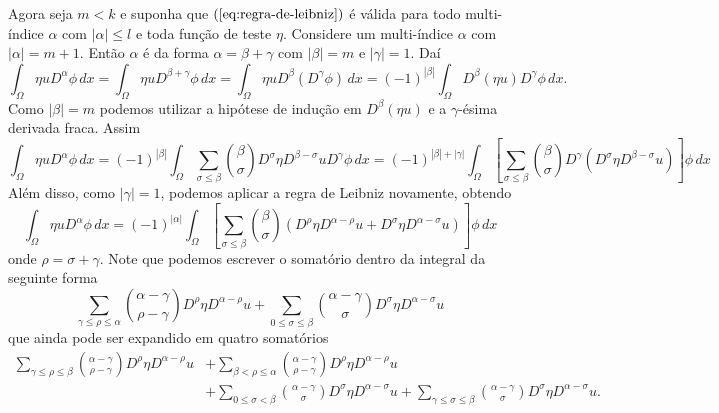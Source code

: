 \documentclass[a4paper, 11pt]{book}
\theoremstyle{definition}
\begin{document}
\begin{prf}
    Agora seja $m < k$ e suponha que $(\ref{eq:regra-de-leibniz})$ é válida para todo multi-índice $\alpha$ com $|\alpha| \leqslant l$ e toda função de teste $\eta$.
    Considere um multi-índice $\alpha$ com $|\alpha| = m + 1$.
    Então $\alpha$ é da forma $\alpha = \beta + \gamma$ com $|\beta| = m$ e $|\gamma| = 1$. 
    Daí 
    \[
        \int_\Omega \eta u D^{\alpha}\phi \, dx = \int_\Omega \eta u D^{\beta + \gamma}\phi \, dx = \int_\Omega \eta u D^\beta(D^\gamma \phi) \, dx = (-1)^{|\beta|} \int_\Omega D^{\beta} (\eta u) D^{\gamma}\phi \,dx.
    \]
    Como $|\beta| = m$ podemos utilizar a hipótese de indução em $D^{\beta}(\eta u)$ e a $\gamma$-ésima derivada fraca. Assim
    {\small
    \[
        \int_\Omega \eta u D^{\alpha}\phi \, dx = (-1)^{|\beta|} \int_\Omega \sum_{\sigma \leqslant \beta} \binom{\beta}{\sigma} D^{\sigma} \eta D^{\beta - \sigma} u D^{\gamma}\phi \, dx = (-1)^{|\beta| + |\gamma|} \int_\Omega \left[\sum_{\sigma \leqslant \beta} \binom{\beta}{\sigma} D^{\gamma}(D^{\sigma} \eta D^{\beta - \sigma} u)\right] \phi \, dx
    \]}\!
    Além disso, como $|\gamma| = 1$, podemos aplicar a regra de Leibniz novamente, obtendo
    \begin{equation} \label{eq:integral-etau}
        \int_\Omega \eta u D^{\alpha}\phi \, dx = (-1)^{|\alpha|} \int_\Omega \left[\sum_{\sigma \leqslant \beta} \binom{\beta}{\sigma} \left(D^{\rho}\eta D^{\alpha - \rho} u + D^{\sigma} \eta D^{\alpha - \sigma} u\right)\right] \phi \,dx
    \end{equation}
    onde $\rho = \sigma + \gamma$. 
    Note que podemos escrever o somatório dentro da integral da seguinte forma
    \begin{equation*} \label{eq:somatorio}
        \sum_{\gamma \leqslant \rho \leqslant \alpha} \binom{\alpha - \gamma}{\rho - \gamma} D^{\rho}\eta D^{\alpha - \rho} u + \sum_{0 \leqslant\sigma \leqslant \beta} \binom{\alpha - \gamma}{\sigma} D^{\sigma} \eta D^{\alpha - \sigma} u
    \end{equation*}
    que ainda pode ser expandido em quatro somatórios
    \begin{equation} \label{eq:somatorio-2}
        \begin{aligned}
            \sum_{\gamma \leqslant \rho \leqslant \beta} \binom{\alpha - \gamma}{\rho - \gamma} D^{\rho}\eta D^{\alpha - \rho} u &+ \sum_{\beta < \rho \leqslant \alpha} \binom{\alpha - \gamma}{\rho - \gamma} D^{\rho}\eta D^{\alpha - \rho} u \\
            &+ \sum_{0 \leqslant \sigma < \beta} \binom{\alpha - \gamma}{\sigma} D^{\sigma} \eta D^{\alpha - \sigma} u + \sum_{\gamma \leqslant \sigma \leqslant \beta} \binom{\alpha - \gamma}{\sigma} D^{\sigma} \eta D^{\alpha - \sigma} u.

\end{aligned}
\end{equation}
\end{prf}
\end{document}

